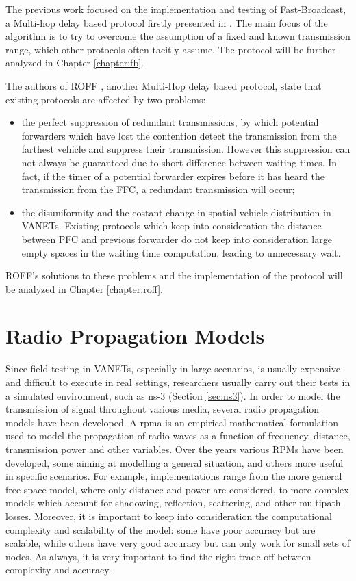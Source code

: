 \begin{enumerate}
			
				The previous work\cite{ROM2017} focused on the implementation and testing of Fast-Broadcast, a Multi-hop delay based protocol firstly presented in \cite{4199282}. The main focus of the algorithm is to try to overcome the assumption of a fixed and known transmission range, which other protocols often tacitly assume. The protocol will be further analyzed in Chapter \ref{chapter:fb}.
				
				The authors of ROFF \cite{6906275}, another Multi-Hop delay based protocol, state that existing protocols are affected by two problems:
				\begin{itemize}
					\item the perfect suppression of redundant transmissions, by which potential forwarders which have lost the contention detect the transmission from the farthest vehicle and suppress their transmission. However this suppression can not always be guaranteed due to short difference between waiting times. In fact, if the timer of a potential forwarder expires before it has heard the transmission from the FFC, a redundant transmission will occur;
					\item the disuniformity and the costant change in spatial vehicle distribution in VANETs. Existing protocols which keep into consideration the distance between PFC and previous forwarder do not keep into consideration large empty spaces in the waiting time computation, leading to unnecessary wait.
				\end{itemize}
				ROFF's solutions to these problems and the implementation of the protocol will be analyzed in Chapter \ref{chapter:roff}.

	\section{Radio Propagation Models}
		Since field testing in VANETs, especially in large scenarios, is usually expensive and difficult to execute in real settings, researchers usually carry out their tests in a simulated environment, such as ns-3 (Section \ref{sec:ns3}). In order to model the transmission of signal throughout various media, several radio propagation models have been developed.
		A \gls{rpma} is an empirical mathematical formulation used to model the propagation of radio waves as a function of frequency, distance, transmission power and other variables. Over the years various RPMs have been developed, some aiming at modelling a general situation, and others more useful in specific scenarios. For example, implementations range from the more general free space model, where only distance and power are considered, to more complex models which account for shadowing, reflection, scattering, and other multipath losses. Moreover, it is important to keep into consideration the computational complexity and scalability of the model: some have poor accuracy but are scalable, while others have very good accuracy but can only work for small sets of nodes. As always, it is very important to find the right trade-off between complexity and accuracy.
		

\end{enumerate}
